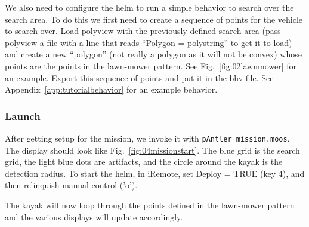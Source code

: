We also need to configure the helm to run a simple behavior to search over the search area.  To do this we first need to create a sequence of points for the vehicle to search over.  Load polyview with the previously defined search area (pass polyview a file with a line that reads ``Polygon = polystring'' to get it to load) and create a new ``polygon'' (not really a polygon as it will not be convex) whose points are the points in the lawn-mower pattern.  See Fig.~\ref{fig:02lawnmower} for an example.  Export this sequence of points and put it in the bhv file.  See Appendix~\ref{app:tutorialbehavior} for an example behavior.


\subsubsection{Launch}
\label{ex:tutorial:launch}
After getting setup for the mission, we invoke it with {\tt pAntler~mission.moos}.  The display should look like Fig.~\ref{fig:04missionstart}.  The blue grid is the search grid, the light blue dots are artifacts, and the circle around the kayak is the detection radius.  To start the helm, in iRemote, set Deploy = TRUE (key 4), and then relinquish manual control ('o').


The kayak will now loop through the points defined in the lawn-mower pattern and the various displays will update accordingly.
